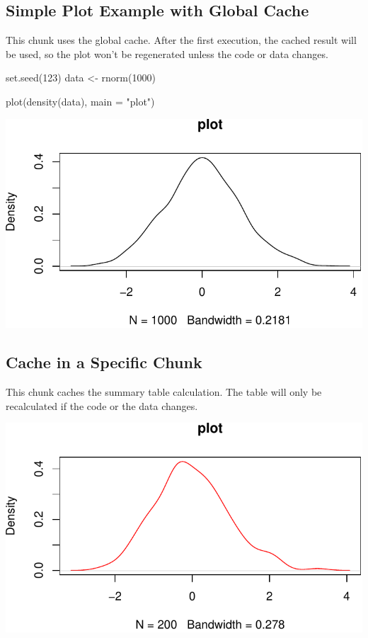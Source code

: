 \documentclass[
  journal,
]{IEEEtran}%
\newenvironment{Shaded}{\begin{snugshade}}{\end{snugshade}}
\newcommand{\AttributeTok}[1]{\textcolor[rgb]{0.40,0.45,0.13}{#1}}
\newcommand{\DecValTok}[1]{\textcolor[rgb]{0.68,0.00,0.00}{#1}}
\newcommand{\FunctionTok}[1]{\textcolor[rgb]{0.28,0.35,0.67}{#1}}
\newcommand{\NormalTok}[1]{\textcolor[rgb]{0.00,0.23,0.31}{#1}}
\newcommand{\OtherTok}[1]{\textcolor[rgb]{0.00,0.23,0.31}{#1}}
\newcommand{\StringTok}[1]{\textcolor[rgb]{0.13,0.47,0.30}{#1}}
\begin{document}
\subsection{Simple Plot Example with Global
Cache}\label{simple-plot-example-with-global-cache}

This chunk uses the global cache. After the first execution, the cached
result will be used, so the plot won't be regenerated unless the code or
data changes.

\begin{Shaded}
\begin{Highlighting}[]
\FunctionTok{set.seed}\NormalTok{(}\DecValTok{123}\NormalTok{)}
\NormalTok{data }\OtherTok{\textless{}{-}} \FunctionTok{rnorm}\NormalTok{(}\DecValTok{1000}\NormalTok{)}

\FunctionTok{plot}\NormalTok{(}\FunctionTok{density}\NormalTok{(data), }\AttributeTok{main =} \StringTok{"plot"}\NormalTok{)}
\end{Highlighting}
\end{Shaded}

\includegraphics{ieee-template_files/figure-pdf/unnamed-chunk-1-1.pdf}

\subsection{Cache in a Specific Chunk}\label{cache-in-a-specific-chunk}

This chunk caches the summary table calculation. The table will only be
recalculated if the code or the data changes.

\includegraphics{ieee-template_files/figure-pdf/unnamed-chunk-2-1.pdf}
\end{document}
